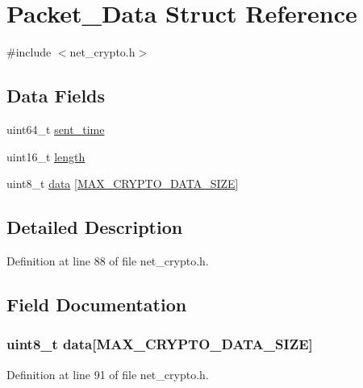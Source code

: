 \hypertarget{struct_packet___data}{\section{Packet\+\_\+\+Data Struct Reference}
\label{struct_packet___data}
}


{\ttfamily \#include $<$net\+\_\+crypto.\+h$>$}

\subsection*{Data Fields}
\begin{DoxyCompactItemize}
\item 
uint64\+\_\+t \hyperlink{struct_packet___data_ae6e5e2c139451ff48ec8dbba5d21bb50}{sent\+\_\+time}
\item 
uint16\+\_\+t \hyperlink{struct_packet___data_a1892eba2086d12ac2b09005aeb09ea3b}{length}
\item 
uint8\+\_\+t \hyperlink{struct_packet___data_ab895a6b34c217017925a6aea69c78c09}{data} \mbox{[}\hyperlink{net__crypto_8h_a1b6e5122f9fdc5ef548ccf920f0c246e}{M\+A\+X\+\_\+\+C\+R\+Y\+P\+T\+O\+\_\+\+D\+A\+T\+A\+\_\+\+S\+I\+Z\+E}\mbox{]}
\end{DoxyCompactItemize}


\subsection{Detailed Description}


Definition at line 88 of file net\+\_\+crypto.\+h.



\subsection{Field Documentation}
\hypertarget{struct_packet___data_ab895a6b34c217017925a6aea69c78c09}{
\subsubsection[{data}]{\setlength{\rightskip}{0pt plus 5cm}uint8\+\_\+t data\mbox{[}{\bf M\+A\+X\+\_\+\+C\+R\+Y\+P\+T\+O\+\_\+\+D\+A\+T\+A\+\_\+\+S\+I\+Z\+E}\mbox{]}}}\label{struct_packet___data_ab895a6b34c217017925a6aea69c78c09}


Definition at line 91 of file net\+\_\+crypto.\+h.



